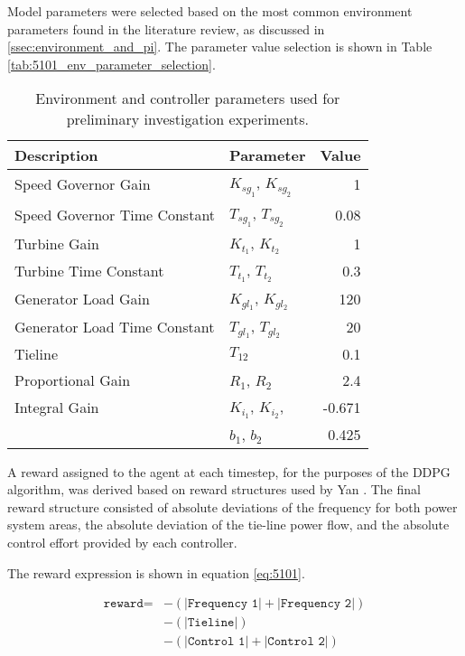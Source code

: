 Model parameters were selected based on the most common environment parameters found in the literature review, as discussed in \textsection \ref{ssec:environment_and_pi}. The parameter value selection is shown in Table \ref{tab:5101_env_parameter_selection}.

\begin{table}[h]
	\centering
	\caption{Environment and controller parameters used for preliminary investigation experiments.}\label{tab:5101_env_parameter_selection}
	\begin{tabular}{llr}
		\toprule
		\textbf{Description} & \textbf{Parameter} & \textbf{Value} \\
		\midrule
		Speed Governor Gain & $K_{sg_1}$, $K_{sg_2}$ & 1 \\
		Speed Governor Time Constant & $T_{sg_1}$, $T_{sg_2}$ & 0.08 \\
		Turbine Gain & $K_{t_1}$, $K_{t_2}$ & 1 \\
		Turbine Time Constant & $T_{t_1}$, $T_{t_2}$ & 0.3 \\
		Generator Load Gain & $K_{gl_1}$, $K_{gl_2}$ & 120 \\
		Generator Load Time Constant & $T_{gl_1}$, $T_{gl_2}$ & 20 \\
		Tieline & $T_{12}$ & 0.1 \\
		Proportional Gain & $R_1$, $R_2$ & 2.4 \\
		Integral Gain & $K_{i_1}$, $K_{i_2}$, & -0.671 \\
		 & $b_1$, $b_2$ & 0.425 \\
		\bottomrule
	\end{tabular}\label{tab:5000}
\end{table}

A reward assigned to the agent at each timestep, for the purposes of the DDPG algorithm, was derived based on reward structures used by Yan \cite{Yan2020}. The final reward structure consisted of absolute deviations of the frequency for both power system areas, the absolute deviation of the tie-line power flow, and the absolute control effort provided by each controller.

The reward expression is shown in equation \ref{eq:5101}.

\begin{equation}
	\begin{split}
		\texttt{reward} = 	&- (|\texttt{Frequency 1}| + |\texttt{Frequency 2}|) \\
			  				&- (|\texttt{Tieline}|) \\
			  				&- (|\texttt{Control 1}| + |\texttt{Control 2}|)\label{eq:5101}
	\end{split}
\end{equation}